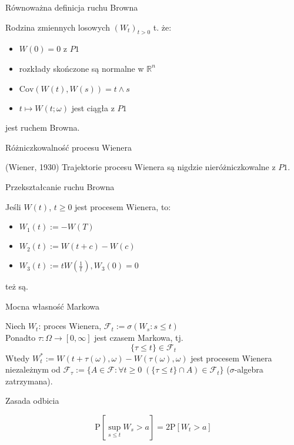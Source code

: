 \documentclass[avery5371,grid,frame]{flashcards}
\begin{document}
\begin{flashcard}[Twierdzenie]{Równoważna definicja ruchu Browna}

\smallskip
Rodzina zmiennych losowych $ \left( W_t \right) _{t > 0} $ t. że:
\begin{itemize}
\item $W(0) = 0$ z $P1$
\item rozkłady skończone są normalne w $\mathbb{R}^n$
\item $\text{Cov}(W(t), W(s)) = t \wedge s$
\item $t \mapsto W(t; \omega)$ jest ciągła z $P1$
\end{itemize}
jest ruchem Browna.
\end{flashcard}

\begin{flashcard}[Twierdzenie]{Różniczkowalność procesu Wienera}

\smallskip
(Wiener, 1930) Trajektorie procesu Wienera są nigdzie nieróżniczkowalne z $P1$.
\end{flashcard}

\begin{flashcard}[Twierdzenie]{Przekształcanie ruchu Browna}

\smallskip
Jeśli $W(t)$, $t \geq 0$ jest procesem Wienera, to:
\begin{itemize}
\item $W_1(t) := -W(T)$
\item $W_2(t) := W(t+c) - W(c)$
\item $W_3(t) := tW(\frac{1}{t}), W_3(0)=0$ 
\end{itemize}
też są.	
\end{flashcard}

\begin{flashcard}[Twierdzenie]{Mocna własność Markowa}

\smallskip
Niech $W_t$: proces Wienera, $\mathcal{F}_t := \sigma (W_s : s \leq t) $ \\
Ponadto $\tau: \Omega \rightarrow [0, \infty]$ jest czasem Markowa, tj. $$ \{ \tau \leq t \} \in \mathcal{F}_t$$
Wtedy $W ^* _t := W(t + \tau(\omega), \omega) - W(\tau(\omega), \omega)$ jest procesem Wienera niezależnym od $\mathcal{F}_\tau := \{ A \in \mathcal{F} : \forall t \geq 0 \; ( \{\tau \leq t \} \cap A) \in \mathcal{F}_t \} $ ($\sigma$-algebra zatrzymana).
\end{flashcard}

\begin{flashcard}[Twierdzenie]{Zasada odbicia}

\smallskip
$$\text{P} [ \sup _{ s \leq t } W_s > a ] = 2 \text{P} [ W_t > a ] $$ 
\end{flashcard}
\end{document}
